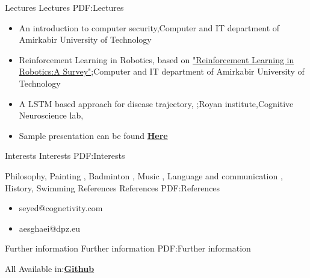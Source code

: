 \documentclass[letterpaper,MMMyyyy,nonstopmode]{simpleresumecv}
\begin{document}
\begin{Body}
 \Section
{Lectures}
{Lectures}
{PDF:Lectures}

\Entry
\begin{itemize}
\item An introduction to computer security,Computer and IT department of Amirkabir University of Technology
  \hfill
{}

\item Reinforcement Learning in Robotics, based on \href{https://ri.cmu.edu/pub_files/2013/7/Kober_IJRR_2013.pdf} {"Reinforcement Learning in Robotics:A Survey"};Computer and IT department of Amirkabir University of Technology
  \hfill
{}

\item A LSTM based approach for disease trajectory, ;Royan institute,Cognitive Neuroscience lab,
  \hfill
{}

\item Sample presentation can be found  \href{https://github.com/Yasaman1997/Presentation/blob/master/bandicam%202020-08-01%2011-49-26-553.mp4} {\textbf{Here}}

\end{itemize}


\Section
{Interests}
{Interests}
{PDF:Interests}

\Entry
Philosophy,
Painting ,
Badminton ,
Music ,  
Language  and communication ,
History,
Swimming
\Section
{References}
{References}
{PDF:References}

\Entry
\begin{itemize}
\item seyed@cognetivity.com 
\item aesghaei@dpz.eu

\end{itemize}


\Section
{Further information}
{Further information}
{PDF:Further information}

\Entry
All Available in:\href{https://github.com/Yasaman1997} {\textbf{Github}}  














\end{Body}

\end{document}
